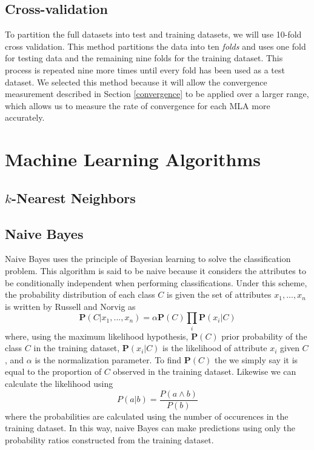 \documentclass{article}
\newcommand{\ve}[1]{\boldsymbol{\mathbf{#1}}}
\begin{document}
		\subsection{Cross-validation}
			To partition the full datasets into test and training datasets, we will use 10-fold cross validation. 
			This method partitions the data into ten \textit{folds} and uses one fold for testing data and the remaining nine folds for the training dataset. 
			This process is repeated nine more times until every fold has been used as a test dataset. 
			We selected this method because it will allow the convergence measurement described in Section \ref{convergence} to be applied over a larger range, which allows us to measure the rate of convergence for each MLA more accurately.
	\section{Machine Learning Algorithms}
		\subsection{$k$-Nearest Neighbors}
		\subsection{Naive Bayes}
			Naive Bayes uses the principle of Bayesian learning to solve the classification problem. This algorithm is said to be naive because it considers the attributes to be conditionally independent when performing classifications. Under this scheme, the probability distribution of each class $C$ is given the set of attributes $x_1,...,x_n$ is written by Russell and Norvig as
			\begin{equation*}
				\ve{P}(C|x_1,...,x_n) = \alpha \ve{P}(C) \prod_i \ve{P}(x_i| C) \label{nb_pd}
			\end{equation*}
			where, using the maximum likelihood hypothesis, $\ve{P}(C)$ prior probability of the class $C$ in the training dataset, $\ve{P}(x_i|C)$ is the likelihood of attribute $x_i$ given $C$, and $\alpha$ is the normalization parameter. To find $\ve{P}(C)$ the we simply say it is equal to the proportion of $C$ observed in the training dataset. Likewise we can calculate the likelihood using
			\begin{equation*}
				P(a|b) = \frac{P(a \land b)}{P(b)}
			\end{equation*}
			where the probabilities are calculated using the number of occurences in the training dataset. In this way, naive Bayes can make predictions using only the probability ratios constructed from the training dataset.
\end{document}

